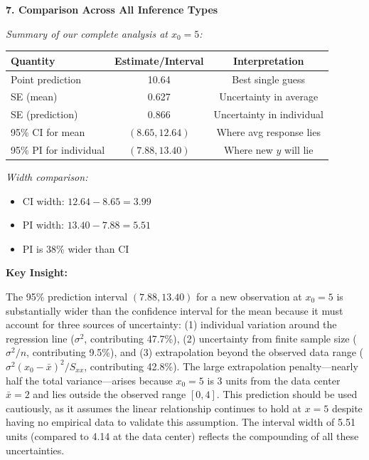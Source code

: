 \documentclass[12pt]{article}
\begin{document}
\begin{explanation}
\textbf{7. Comparison Across All Inference Types}

\textit{Summary of our complete analysis at $x_0 = 5$:}

\begin{center}
\begin{tabular}{|l|c|c|}
\hline
\textbf{Quantity} & \textbf{Estimate/Interval} & \textbf{Interpretation} \\
\hline
Point prediction & 10.64 & Best single guess \\
SE (mean) & 0.627 & Uncertainty in average \\
SE (prediction) & 0.866 & Uncertainty in individual \\
95\% CI for mean & $(8.65, 12.64)$ & Where avg response lies \\
95\% PI for individual & $(7.88, 13.40)$ & Where new $y$ will lie \\
\hline
\end{tabular}
\end{center}

\textit{Width comparison:}
\begin{itemize}
    \item CI width: $12.64 - 8.65 = 3.99$
    \item PI width: $13.40 - 7.88 = 5.51$
    \item PI is 38\% wider than CI
\end{itemize}

\textbf{Key Insight:}

The 95\% prediction interval $(7.88, 13.40)$ for a new observation at $x_0 = 5$ is substantially wider than the confidence interval for the mean because it must account for three sources of uncertainty: (1) individual variation around the regression line ($\sigma^2$, contributing 47.7\%), (2) uncertainty from finite sample size ($\sigma^2/n$, contributing 9.5\%), and (3) extrapolation beyond the observed data range ($\sigma^2(x_0-\bar{x})^2/S_{xx}$, contributing 42.8\%). The large extrapolation penalty—nearly half the total variance—arises because $x_0 = 5$ is 3 units from the data center $\bar{x} = 2$ and lies outside the observed range $[0, 4]$. This prediction should be used cautiously, as it assumes the linear relationship continues to hold at $x = 5$ despite having no empirical data to validate this assumption. The interval width of 5.51 units (compared to 4.14 at the data center) reflects the compounding of all these uncertainties.
\end{explanation}
\end{document}
